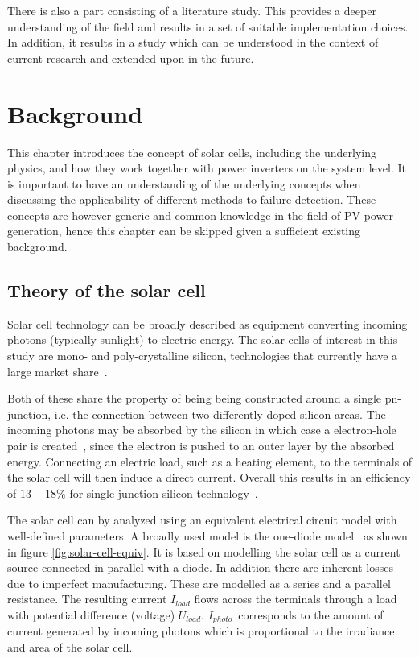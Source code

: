 There is also a part consisting of a literature study.
This provides a deeper understanding of the field and results in a set of suitable implementation choices.
In addition, it results in a study which can be understood in the context of current research and extended upon in the future.

\chapter{Background}
This chapter introduces the concept of solar cells, including the underlying physics,
and how they work together with power inverters on the system level.
It is important to have an understanding of the underlying concepts when discussing the applicability of different methods to failure detection.
These concepts are however generic and common knowledge in the field of PV power generation, 
hence this chapter can be skipped given a sufficient existing background.

\section{Theory of the solar cell}
Solar cell technology can be broadly described as equipment converting incoming photons (typically sunlight) to electric energy.
The solar cells of interest in this study are mono- and poly-crystalline silicon, technologies that currently have a large market share~\cite{Zhao2010thesis}.

Both of these share the property of being being constructed around a single pn-junction, i.e. the connection between two differently doped silicon areas.
The incoming photons may be absorbed by the silicon in which case a electron-hole pair is created~\cite{Zhao2010thesis}, since the electron is pushed to an outer layer by the absorbed energy.
Connecting an electric load, such as a heating element, to the terminals of the solar cell will then induce a direct current.
Overall this results in an efficiency of $13-18\%$ for single-junction silicon technology~\cite{Zhao2010thesis}.

The solar cell can by analyzed using an equivalent electrical circuit model with well-defined parameters.
A broadly used model is the one-diode model~\cite{Walker2001} as shown in figure \ref{fig:solar-cell-equiv}.
It is based on modelling the solar cell as a current source connected in parallel with a diode.
In addition there are inherent losses due to imperfect manufacturing.
These are modelled as a series and a parallel resistance.
The resulting current $I_{load}$ flows across the terminals through a load with potential difference (voltage) $U_{load}$.
$I_{photo}$ corresponds to the amount of current generated by incoming photons which is proportional to the irradiance and area of the solar cell.


